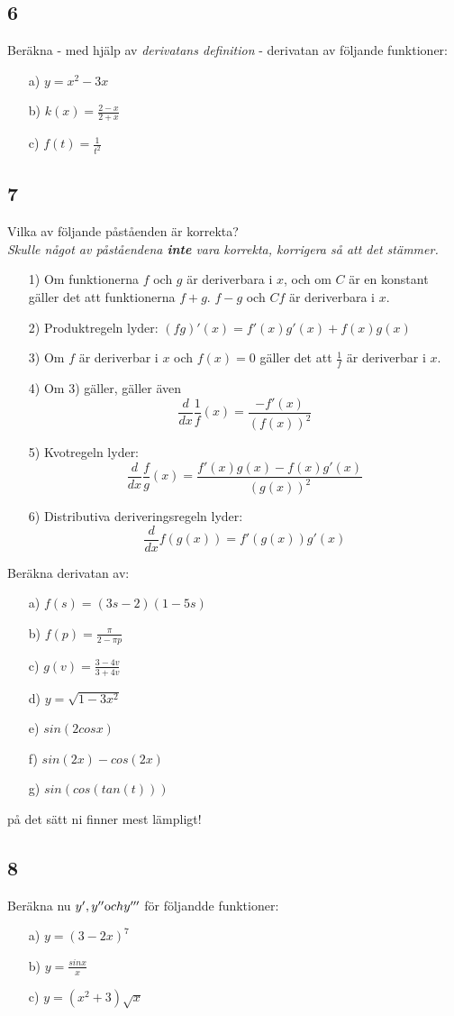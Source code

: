 \documentclass{article}
\begin{document}
\subsection*{6}
Beräkna - med hjälp av {\it derivatans definition} - derivatan av följande funktioner:
\begin{itemize}
    \item[a) ] $y = x^2 - 3x$
    \item[b) ] $k(x) = \frac{2-x}{2+x}$
    \item[c) ] $f(t) = \frac{1}{t^2}$
\end{itemize}

\subsection*{7}
Vilka av följande påståenden är korrekta?\\
{\it Skulle något av påståendena {\bf inte} vara korrekta, korrigera så att 
det stämmer.}
\begin{itemize}
    \item[1) ] Om funktionerna $f$ och $g$ är deriverbara i $x$, och om $C$ 
               är en konstant gäller det att funktionerna $f + g$. $f - g$
               och $Cf$ är deriverbara i $x$.
    \item[2) ] Produktregeln lyder:
               $(fg)'(x) = f'(x)g'(x) + f(x)g(x)$
    \item[3) ] Om $f$ är deriverbar i $x$ och $f(x) = 0$ gäller det att 
               $\frac{1}{f}$ är deriverbar i $x$.
    \item[4) ] Om 3) gäller, gäller även $$\frac{d}{dx}{\frac{1}{f}}(x) = 
               \frac{-f'(x)}{(f(x))^2}$$ 
    \item[5) ] Kvotregeln lyder: 
               $$\frac{d}{dx}{\frac{f}{g}}(x) = \frac{f'(x)g(x) - f(x)g'(x)}{(g(x))^2}$$ 
    \item[6) ] Distributiva deriveringsregeln lyder:
               $$\frac{d}{dx} f(g(x)) = f'(g(x))g'(x)$$
\end{itemize}
\noindent
Beräkna derivatan av:
\begin{itemize}
    \item[a) ] $f(s) =  (3s - 2)(1-5s)$ 
    \item[b) ] $f(p) = \frac{\pi}{2- \pi p}$
    \item[c) ] $g(v) = \frac{3-4v}{3+4v}$
    \item[d) ] $y = \sqrt{1-3x^2}$
    \item[e) ] $sin(2 cos x)$
    \item[f) ] $sin(2x) - cos(2x)$
    \item[g) ] $sin(cos(tan(t)))$
\end{itemize}
på det sätt ni finner mest lämpligt!

\subsection*{8}
Beräkna nu $y', y'' {\text och } y'''$ för följandde funktioner:
\begin{itemize}
    \item[a) ] $y = (3-2x)^7$
    \item[b) ] $y = \frac{sin x}{x}$
    \item[c) ] $y = (x^2 + 3)\sqrt{x}$
\end{itemize}
\end{document}
